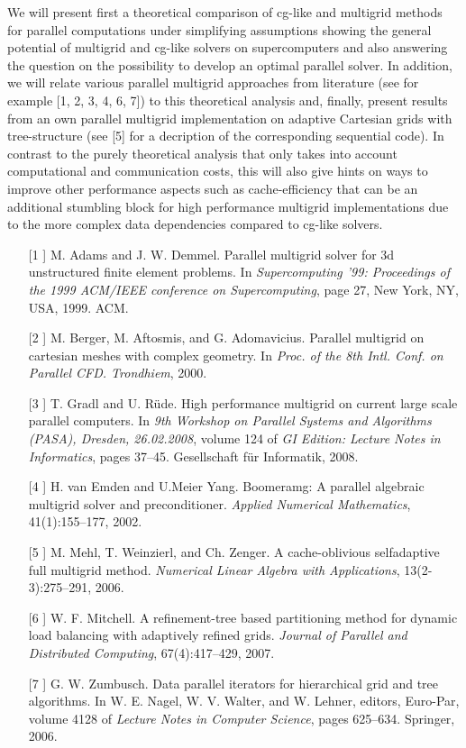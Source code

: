 \documentclass{report}
\begin{document}
We will present first a theoretical
comparison of cg-like and multigrid methods for parallel computations
under simplifying assumptions showing the general potential of
multigrid and cg-like solvers on supercomputers and also
answering the question on the possibility to develop an optimal
parallel solver. In addition, we will relate various parallel
multigrid approaches from literature (see for example
[1, 2, 3, 4, 6, 7]) to this theoretical analysis
and, finally, present results from an own parallel multigrid
implementation on adaptive Cartesian grids with tree-structure
(see [5] for a decription of the corresponding
sequential code).
In contrast to the purely theoretical analysis that only takes into
account computational and communication costs, this will also give
hints on ways to improve other performance aspects such as
cache-efficiency that can be an additional stumbling block
for high performance multigrid implementations due to the more
complex data dependencies compared to cg-like solvers.

\begin{itemize}
\item[[1]] M. Adams and J. W. Demmel. Parallel multigrid solver for 3d
unstructured finite element problems. In {\em Supercomputing '99:
Proceedings of the 1999
ACM/IEEE conference on Supercomputing}, page 27, New York,
NY, USA, 1999. ACM.
\item[[2]] M. Berger, M. Aftosmis, and G. Adomavicius. Parallel multigrid
on cartesian meshes with complex geometry. In {\em Proc. of the
8th Intl. Conf. on Parallel CFD. Trondhiem}, 2000.
\item[[3]] T. Gradl and U. R\"ude. High performance multigrid on current
large scale parallel computers. In {\em 9th Workshop on Parallel
Systems and Algorithms (PASA), Dresden, 26.02.2008}, volume 124
of {\em GI Edition: Lecture Notes in Informatics},
pages 37--45. Gesellschaft f\"ur Informatik, 2008.
\item[[4]] H. van Emden and U.Meier Yang. Boomeramg: A parallel
algebraic multigrid solver and preconditioner. {\em Applied
Numerical
Mathematics}, 41(1):155--177, 2002.
\item[[5]] M. Mehl, T. Weinzierl, and Ch. Zenger. A cache-oblivious
selfadaptive full multigrid method. {\em Numerical Linear Algebra
with Applications}, 13(2-3):275--291, 2006.
\item[[6]] W. F. Mitchell. A refinement-tree based partitioning method for
dynamic load balancing with adaptively refined grids. {\em Journal
of Parallel and Distributed Computing}, 67(4):417--429, 2007.
\item[[7]] G. W. Zumbusch. Data parallel iterators for hierarchical grid
and tree algorithms. In W. E. Nagel, W. V. Walter,
and W. Lehner, editors, Euro-Par, volume 4128 of {\em Lecture Notes
in Computer Science}, pages 625--634. Springer, 2006.
\end{itemize}
\end{document}
